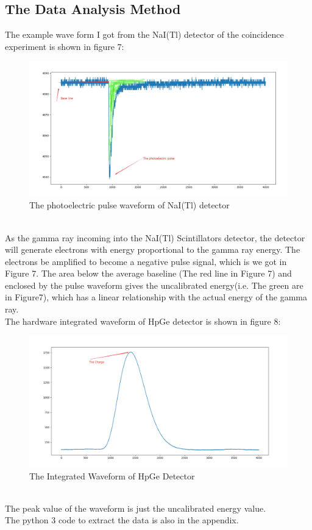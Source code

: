\documentclass[12pt]{article}
\begin{document}
	\subsection{The Data Analysis Method}
	The example wave form I got from the NaI(Tl) detector of the coincidence experiment is shown in figure 7:
	\begin{figure}[h]
		\centering
		\includegraphics[width=0.7\linewidth,height=0.2\textheight]{pic/Inkedwaveform_NaI_LI}
		\caption{The photoelectric pulse waveform of NaI(Tl) detector}
		\label{fig:waveformnai}
	\end{figure}\\
	As the gamma ray incoming  into the NaI(Tl) Scintillators detector, the detector will generate electrons with energy proportional to the gamma ray energy. The electrons be amplified to become a negative pulse signal, which is we got in Figure 7. The area below the average  baseline (The red line in Figure 7) and enclosed by the pulse waveform gives the uncalibrated energy(i.e. The green are in Figure7), which has a linear relationship with the actual energy of the gamma ray.\\
	The hardware integrated waveform of HpGe detector is shown in figure 8:
	\begin{figure}[h]
		\centering
		\includegraphics[width=0.7\linewidth,height=0.15\textheight]{pic/waveform_HpGe}
		\caption{The Integrated Waveform of HpGe Detector}
		\label{fig:waveformhpge}
	\end{figure}\\
	The peak value of the waveform is just the uncalibrated energy value.\\
	The python 3 code to extract the data is also in the appendix.
\end{document}
